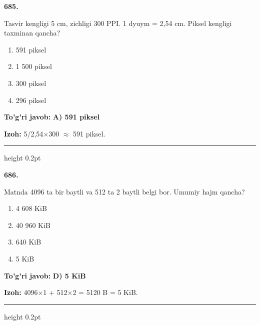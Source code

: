 \documentclass[10pt,a4paper,oneside]{article}
\begin{document}
\noindent\textbf{\color{ink}685.}
\par
Tasvir kengligi 5 cm, zichligi 300 PPI. 1 dyuym = 2,54 cm. Piksel kengligi taxminan qancha?
\begin{enumerate}[label=\Alph*),leftmargin=9mm]
\item 591 piksel
\item 1 500 piksel
\item 300 piksel
\item 296 piksel
\end{enumerate}
\begin{tcolorbox}[enhanced,breakable,colback=teal!4,colframe=teal!50!black,boxrule=0.5pt,arc=1.1mm,left=3mm,right=3mm,top=1.7mm,bottom=1.7mm,before skip=2mm,after skip=2mm]
\textbf{\color{teal}To'g'ri javob:} \textbf{A) 591 piksel}
\par\smallskip
\textbf{Izoh:} 5/2,54\ensuremath{\times}300 \ensuremath{\approx} 591 piksel.
\end{tcolorbox}
\vspace{2mm}\hrule height 0.2pt \vspace{3mm}

\noindent\textbf{\color{ink}686.}
\par
Matnda 4096 ta bir baytli va 512 ta 2 baytli belgi bor. Umumiy hajm qancha?
\begin{enumerate}[label=\Alph*),leftmargin=9mm]
\item 4 608 KiB
\item 40 960 KiB
\item 640 KiB
\item 5 KiB
\end{enumerate}
\begin{tcolorbox}[enhanced,breakable,colback=teal!4,colframe=teal!50!black,boxrule=0.5pt,arc=1.1mm,left=3mm,right=3mm,top=1.7mm,bottom=1.7mm,before skip=2mm,after skip=2mm]
\textbf{\color{teal}To'g'ri javob:} \textbf{D) 5 KiB}
\par\smallskip
\textbf{Izoh:} 4096\ensuremath{\times}1 + 512\ensuremath{\times}2 = 5120 B = 5 KiB.
\end{tcolorbox}
\vspace{2mm}\hrule height 0.2pt \vspace{3mm}
\end{document}

